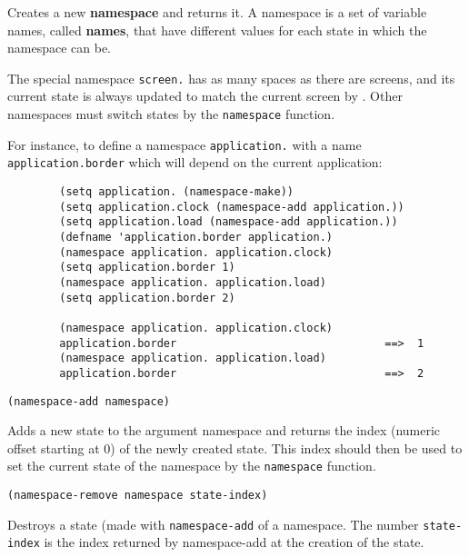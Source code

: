 Creates a new {\bf namespace} and returns it. A namespace is a set of
variable names, called {\bf names}, that have different values for each
state in which the namespace can be. 

The special namespace \verb"screen." has as many spaces as there are
screens, and its current state is always updated to match the current screen
by {\GWM}. Other namespaces must switch states by the \verb"namespace"
function.

For instance, to define a namespace \verb"application." with a name
\verb"application.border" which will depend on the current application:

{\exemplefont\begin{verbatim}
        (setq application. (namespace-make))
        (setq application.clock (namespace-add application.))
        (setq application.load (namespace-add application.))
        (defname 'application.border application.)
        (namespace application. application.clock)
        (setq application.border 1)
        (namespace application. application.load)
        (setq application.border 2)

        (namespace application. application.clock)
        application.border                                ==>  1
        (namespace application. application.load)
        application.border                                ==>  2
\end{verbatim}}


{\usagefont\begin{verbatim}
(namespace-add namespace)
\end{verbatim}}\usageupspace

Adds a new state to the argument namespace and returns the index (numeric
offset starting at 0) of the newly created state. This index should then be
used to set the current state of the namespace by the \verb"namespace"
function.


{\usagefont\begin{verbatim}
(namespace-remove namespace state-index)
\end{verbatim}}\usageupspace

Destroys a state (made with \verb"namespace-add" of a namespace. The number
\verb"state-index" is the index returned by namespace-add at the creation of
the state.


